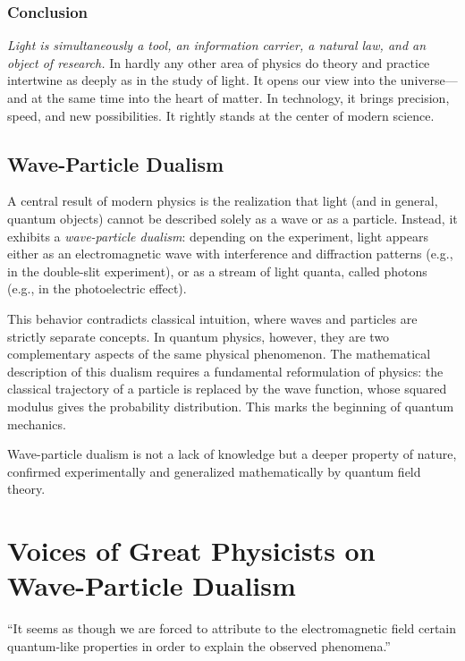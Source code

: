 \newpage
\subsubsection{Conclusion}
\emph{Light is simultaneously a tool, an information carrier, a natural law, and an object of research.} In hardly any other area of physics do theory and practice intertwine as deeply as in the study of light. It opens our view into the universe—and at the same time into the heart of matter. In technology, it brings precision, speed, and new possibilities. It rightly stands at the center of modern science.

\subsection{Wave-Particle Dualism}

A central result of modern physics is the realization that light (and in general, quantum objects) cannot be described solely as a wave or as a particle. Instead, it exhibits a \emph{wave-particle dualism}: depending on the experiment, light appears either as an electromagnetic wave with interference and diffraction patterns (e.g., in the double-slit experiment), or as a stream of light quanta, called photons (e.g., in the photoelectric effect).

This behavior contradicts classical intuition, where waves and particles are strictly separate concepts. In quantum physics, however, they are two complementary aspects of the same physical phenomenon. The mathematical description of this dualism requires a fundamental reformulation of physics: the classical trajectory of a particle is replaced by the wave function, whose squared modulus gives the probability distribution. This marks the beginning of quantum mechanics.

Wave-particle dualism is not a lack of knowledge but a deeper property of nature, confirmed experimentally and generalized mathematically by quantum field theory.

\newpage
\section*{Voices of Great Physicists on Wave-Particle Dualism}

\begin{tcolorbox}[physikbox, title={Albert Einstein (1909)\cite{einstein1909}}]
	\label{box:einstein1909}
	“It seems as though we are forced to attribute to the electromagnetic field certain quantum-like properties in order to explain the observed phenomena.”
\end{tcolorbox}

